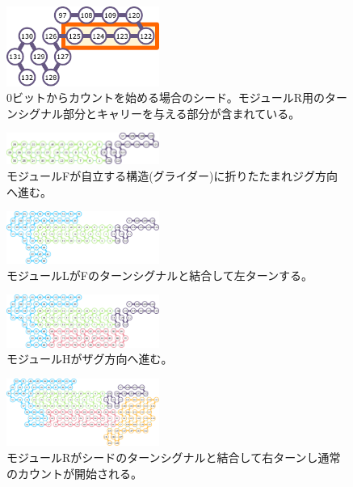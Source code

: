 \documentclass[a4,11pt]{article}
\begin{document}
\begin{figure}[h]
\centering

	\includegraphics[width=5cm]{fig/svg/zeroBit01.pdf}

\caption{0ビットからカウントを始める場合のシード。モジュールR用のターンシグナル部分とキャリーを与える部分が含まれている。}
\label{fig:0bit_01}
\end{figure}
\begin{figure}[h]
\centering

	\includegraphics[width=5cm]{fig/svg/zeroBit02.pdf}

\caption{モジュールFが自立する構造(グライダー)に折りたたまれジグ方向へ進む。}
\label{fig:0bit_02}
\end{figure}
\begin{figure}[h]
\centering

	\includegraphics[width=5cm]{fig/svg/zeroBit03.pdf}

\caption{モジュールLがFのターンシグナルと結合して左ターンする。}
\label{fig:0bit_03}
\end{figure}
\begin{figure}[h]
\label{fig:0bit_04}\centering

	\includegraphics[width=5cm]{fig/svg/zeroBit04.pdf}

\caption{モジュールHがザグ方向へ進む。}
\label{fig:0bit_04}
\end{figure}
\begin{figure}[h]
\centering

	\includegraphics[width=5cm]{fig/svg/zeroBit05.pdf}

\caption{モジュールRがシードのターンシグナルと結合して右ターンし通常のカウントが開始される。}
\label{fig:0bit_05}
\end{figure}
\end{document}
